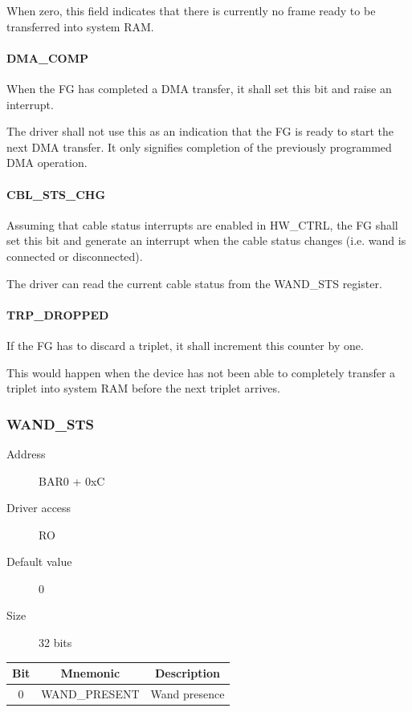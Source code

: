 \documentclass[12pt]{article}
\begin{document}
When zero, this field indicates that there is currently no frame ready to be transferred into system RAM.

\paragraph{DMA\_COMP}

When the FG has completed a DMA transfer, it shall set this bit and raise an interrupt.

The driver shall not use this as an indication that the FG is ready to start the next DMA transfer. It only signifies completion of the previously programmed DMA operation.

\paragraph{CBL\_STS\_CHG}

Assuming that cable status interrupts are enabled in HW\_CTRL, the FG shall set this bit and generate an interrupt when the cable status changes (i.e. wand is connected or disconnected).

The driver can read the current cable status from the WAND\_STS register.

\paragraph{TRP\_DROPPED}

If the FG has to discard a triplet, it shall increment this counter by one.

This would happen when the device has not been able to completely transfer a triplet into system RAM before the next triplet arrives.

\subsubsection{WAND\_STS}

\begin{description}
\item[Address] BAR0 + 0xC
\item[Driver access] RO
\item[Default value] 0
\item[Size] 32 bits
\end{description}

\begin{tabular}{|c|c|c|} \hline
\textbf{Bit} & \textbf{Mnemonic} & \textbf{Description} \\ \hline
0 & WAND\_PRESENT & Wand presence \\ \hline
\end{tabular}
\end{document}
